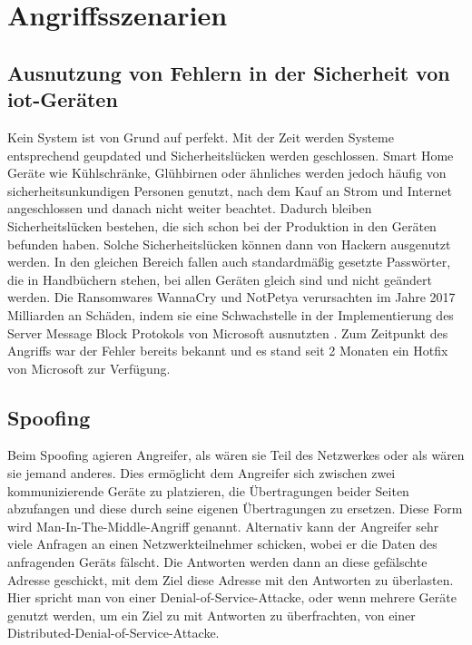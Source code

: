\documentclass[12pt, a4paper, onecolumn, oneside, toc=bibliographynumbered, liststotoc]{scrreprt} %
\begin{document}
	
	\chapter{Angriffsszenarien}
               
		\section{Ausnutzung von Fehlern in der Sicherheit von \ac{iot}-Geräten}
 Kein System ist von Grund auf perfekt. Mit der Zeit werden Systeme entsprechend geupdated und Sicherheitslücken werden geschlossen. Smart Home Geräte wie Kühlschränke, Glühbirnen oder ähnliches werden jedoch häufig von sicherheitsunkundigen Personen genutzt, nach dem Kauf an Strom und Internet angeschlossen und danach nicht weiter beachtet. Dadurch bleiben Sicherheitslücken bestehen, die sich schon bei der Produktion in den Geräten befunden haben. Solche Sicherheitslücken können dann von Hackern ausgenutzt werden. In den gleichen Bereich fallen auch standardmäßig gesetzte Passwörter, die in Handbüchern stehen, bei allen Geräten gleich sind und nicht geändert werden. Die Ransomwares WannaCry und NotPetya verursachten im Jahre 2017 Milliarden an Schäden, indem sie eine Schwachstelle in der Implementierung des Server Message Block Protokols von Microsoft ausnutzten \parencite[5]{Chantzis.2021}. Zum Zeitpunkt des Angriffs war der Fehler bereits bekannt und es stand seit 2 Monaten ein Hotfix von Microsoft zur Verfügung.
 
		\section{Spoofing}
  Beim Spoofing agieren Angreifer, als wären sie Teil des Netzwerkes oder als wären sie jemand anderes. Dies ermöglicht dem Angreifer sich zwischen zwei kommunizierende Geräte zu platzieren, die Übertragungen beider Seiten abzufangen und diese durch seine eigenen Übertragungen zu ersetzen. Diese Form wird Man-In-The-Middle-Angriff genannt.
Alternativ kann der Angreifer sehr viele Anfragen an einen Netzwerkteilnehmer schicken, wobei er die Daten des anfragenden Geräts fälscht. Die Antworten werden dann an diese gefälschte Adresse geschickt, mit dem Ziel diese Adresse mit den Antworten zu überlasten. Hier spricht man von einer Denial-of-Service-Attacke, oder wenn mehrere Geräte genutzt werden, um ein Ziel zu mit Antworten zu überfrachten, von einer Distributed-Denial-of-Service-Attacke.
  
\end{document}
